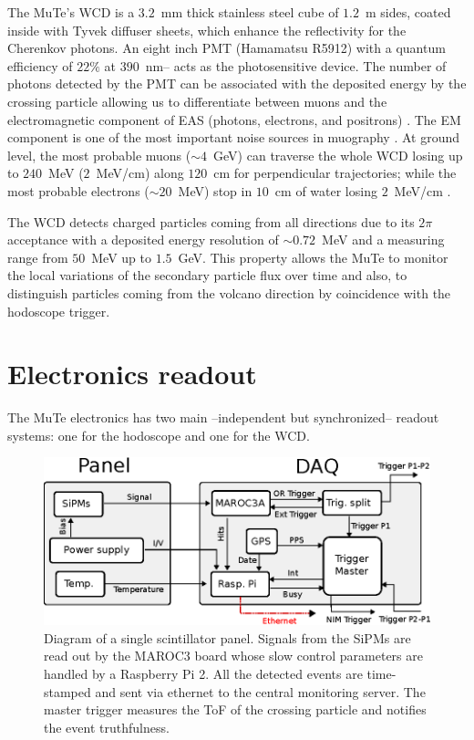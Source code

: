 \documentclass[letterpaper,11pt]{article}
\begin{document}
The MuTe's WCD is a $3.2$~mm thick stainless steel cube of $1.2$~m sides, coated inside with Tyvek diffuser sheets, which enhance the reflectivity for the Cherenkov photons. An eight inch PMT (Hamamatsu R5912) with a quantum efficiency of $22\%$ at $390$~nm-- acts as the photosensitive device. The number of photons detected by the PMT can be associated with the deposited energy by the crossing particle allowing us to differentiate between muons and the electromagnetic component of EAS (photons, electrons, and positrons) \cite{Billoir2014}. The EM component is one of the most important noise sources in muography \cite{KUSAGAYA2015, Nishiyama2014Noise, Marteau2012Noise}. At ground level, the most probable muons ($\sim 4$~GeV) can traverse the whole WCD losing up to $240$~MeV ($2$~MeV/cm) along $120$~cm for perpendicular trajectories; while the most probable electrons ($\sim 20$~MeV) stop in $10$~cm of water losing $2$~MeV/cm  \cite{groom2001muon,groom2000passage,lohmann1985energy,olive2014passage,Vasquez2018, Motta2018}.

The WCD detects charged particles coming from all directions due to its $2\pi$ acceptance with a deposited energy resolution of $\sim 0.72$~MeV and a measuring range from $50$~MeV up to $1.5$~GeV. This property allows the MuTe to monitor the local variations of the secondary particle flux over time \cite{Leon2018} and also, to distinguish particles coming from the volcano direction by coincidence with the hodoscope trigger. 


\section{Electronics readout}
\label{daq}
The MuTe electronics has two main --independent but synchronized-- readout systems: one for the hodoscope and one for the WCD. 

\begin{figure}[htb]
\centering
\includegraphics[width=0.8\columnwidth]{Figures/DAQ.eps}
\caption{Diagram of a single scintillator panel. Signals from the SiPMs are read out by the MAROC3 board whose slow control parameters are handled by a Raspberry Pi 2. All the detected events are time-stamped and sent via ethernet to the central monitoring server. The master trigger measures the ToF of the crossing particle and notifies the event truthfulness.}
  \label{fig:scintillatordetector1}
\end{figure}
\end{document}
